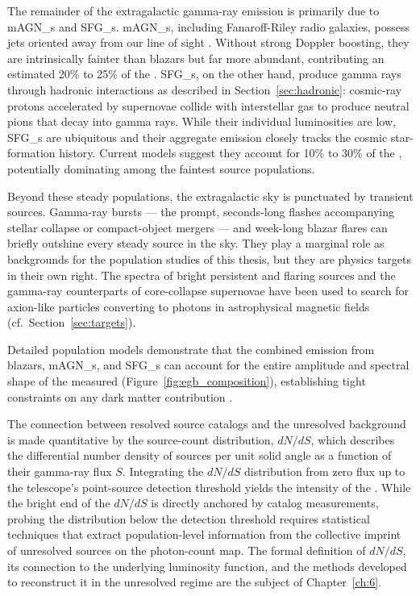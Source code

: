 The remainder of the extragalactic gamma-ray emission is primarily due to \glspl{mAGN_} and \glspl{SFG_}.
\Glspl{mAGN_}, including Fanaroff-Riley radio galaxies, possess jets oriented away from our line of sight \cite{DGRB-review}.
Without strong Doppler boosting, they are intrinsically fainter than blazars but far more abundant, contributing an estimated 20\% to 25\% of the \UGRB \cite{DGRB-review,DiMauro:2013xta}.
\Glspl{SFG_}, on the other hand, produce gamma rays through hadronic interactions as described in Section~\ref{sec:hadronic}: cosmic-ray protons accelerated by supernovae collide with interstellar gas to produce neutral pions that decay into gamma rays.
While their individual luminosities are low, \glspl{SFG_} are ubiquitous and their aggregate emission closely tracks the cosmic star-formation history.
Current models suggest they account for 10\% to 30\% of the \EGB \cite{Ajello:2015mfa,Tamborra:2014xia}, potentially dominating among the faintest source populations.

Beyond these steady populations, the extragalactic sky is punctuated by transient sources.
Gamma-ray bursts --- the prompt, seconds-long flashes accompanying stellar collapse or compact-object mergers --- and week-long blazar flares can briefly outshine every steady source in the sky.
They play a marginal role as backgrounds for the population studies of this thesis, but they are physics targets in their own right.
The spectra of bright persistent and flaring sources and the gamma-ray counterparts of core-collapse supernovae have been used to search for axion-like particles converting to photons in astrophysical magnetic fields~\cite{Fermi-LAT:2016nkz,Payez:2014xsa} (cf.\ Section~\ref{sec:targets}).

Detailed population models demonstrate that the combined emission from blazars, \glspl{mAGN_}, and \glspl{SFG_} can account for the entire amplitude and spectral shape of the measured \EGB (Figure~\ref{fig:egb_composition}), establishing tight constraints on any dark matter contribution \cite{Ajello:2015mfa}.

The connection between resolved source catalogs and the unresolved background is made quantitative by the source-count distribution, $dN/dS$, which describes the differential number density of sources per unit solid angle as a function of their gamma-ray flux $S$.
Integrating the $dN/dS$ distribution from zero flux up to the telescope's point-source detection threshold yields the intensity of the \UGRB.
While the bright end of the $dN/dS$ is directly anchored by catalog measurements, probing the distribution below the detection threshold requires statistical techniques that extract population-level information from the collective imprint of unresolved sources on the photon-count map.
The formal definition of $dN/dS$, its connection to the underlying luminosity function, and the methods developed to reconstruct it in the unresolved regime are the subject of Chapter~\ref{ch:6}.

